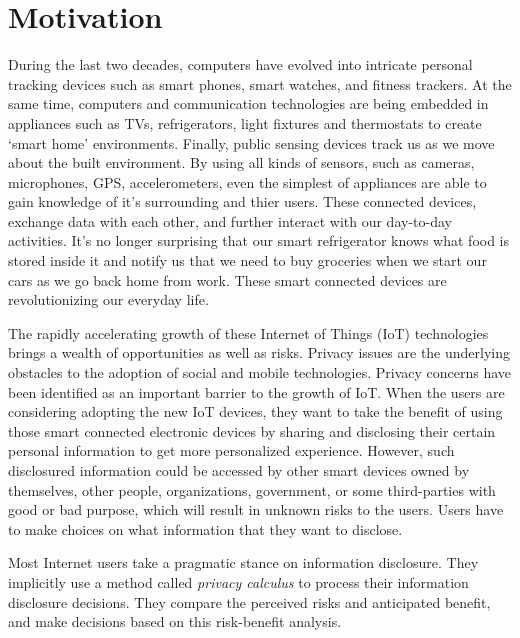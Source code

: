 \chapter{Motivation}\label{chapter:Motivation}
 
During the last two decades, computers have evolved into intricate personal tracking devices such as smart phones, smart watches, and fitness trackers. At the same time, computers and communication technologies are being embedded in appliances such as TVs, refrigerators, light fixtures and thermostats to create `smart home' environments. Finally, public sensing devices track us as we move about the built environment. By using all kinds of sensors, such as cameras, microphones, GPS, accelerometers, even the simplest of appliances are able to gain knowledge of it's surrounding and thier users. These connected devices, exchange data with each other, and further interact with our day-to-day activities. It's no longer surprising that our smart refrigerator knows what food is stored inside it and notify us that we need to buy groceries when we start our cars as we go back home from work. These smart connected devices are revolutionizing our everyday life.

The rapidly accelerating growth of these Internet of Things (IoT) technologies brings a wealth of opportunities as well as risks. Privacy issues are the underlying obstacles to the adoption of social and mobile technologies. Privacy concerns have been identified as an important barrier to the growth of IoT.
When the users are considering adopting the new IoT devices, they want to take the benefit of using those smart connected electronic devices by sharing and disclosing their certain personal information to get more personalized experience. However, such disclosured information could be accessed by other smart devices owned by themselves, other people, organizations, government, or some third-parties with good or bad purpose, which will result in unknown risks to the users. Users have to make choices on what information that they want to disclose.

Most Internet users take a pragmatic stance on information disclosure. They implicitly use a method called \textit{privacy calculus} to process their information disclosure decisions. They compare the perceived risks and anticipated benefit, and make decisions based on this risk-benefit analysis.

